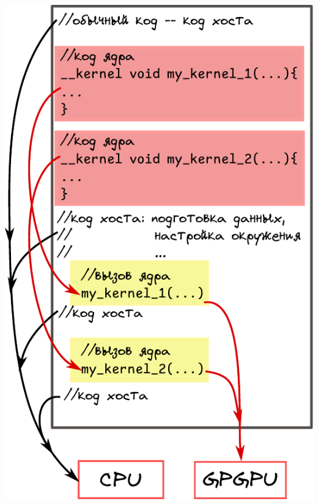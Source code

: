 \documentclass[xcolor=table,aspectratio=169]{beamer}
\begin{document}
\begin{frame}[fragile]
\begin{minipage}[t]{0.28\textwidth}
  \includegraphics[valign=t,width=\textwidth]{pictures/host-kernel-code.pdf}
\end{minipage}
\end{frame}
\end{document}
